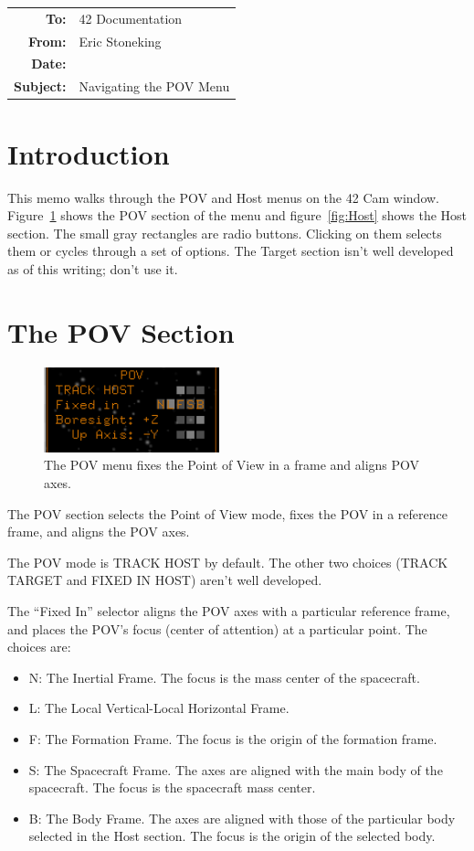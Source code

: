 \documentclass[12pt]{article}
\begin{document}
\begin{tabular}{@{} rl @{}}
    {\bf To:} & 42 Documentation\\ 
    {\bf From:} & Eric Stoneking \\ 
    {\bf Date:} &  \\ 
    {\bf Subject:} & Navigating the POV Menu\\ 
\hline
\end{tabular}
    
\section{Introduction}

This memo walks through the POV and Host menus on the 42 Cam window.  Figure~\ref{fig:POV} shows the POV section of the menu and figure~\ref{fig:Host} shows the Host section.  The small gray rectangles are radio buttons.  Clicking on them selects them or cycles through a set of options.  The Target section isn't well developed as of this writing; don't use it.

\section{The POV Section}

\begin{figure}[htb]
   \centering
   \includegraphics[width=2in]{POV.jpg} %
   \caption{The POV menu fixes the Point of View in a frame and aligns POV axes.}
   \label{fig:POV}
\end{figure}
The POV section selects the Point of View mode, fixes the POV in a reference frame, and aligns the POV axes.

The POV mode is TRACK HOST by default.  The other two choices (TRACK TARGET and FIXED IN HOST) aren't well developed.

The ``Fixed In'' selector aligns the POV axes with a particular reference frame, and places the POV's focus (center of attention) at a particular point.  The choices are:
\begin{itemize}
\item N:  The Inertial Frame.  The focus is the mass center of the spacecraft.
\item L:  The Local Vertical-Local Horizontal Frame.
\item F:  The Formation Frame.  The focus is the origin of the formation frame.
\item S:  The Spacecraft Frame.  The axes are aligned with the main body of the spacecraft.  The focus is the spacecraft mass center.
\item B:  The Body Frame.  The axes are aligned with those of the particular body selected in the Host section.  The focus is the origin of the selected body.
\end{itemize}
\end{document}
